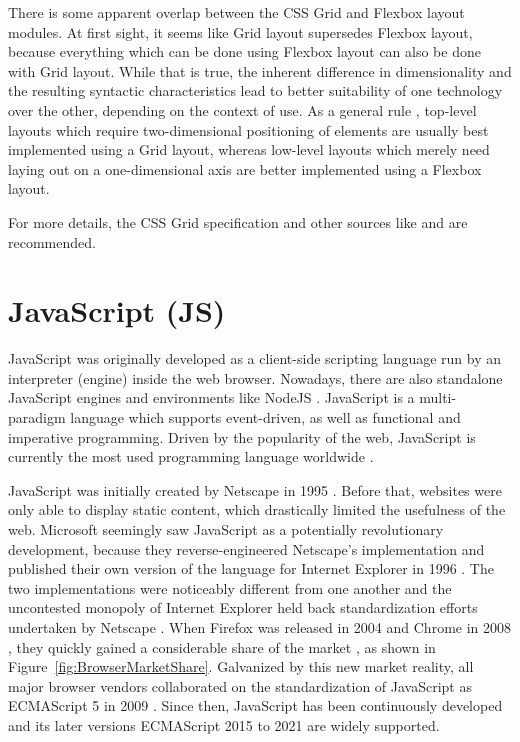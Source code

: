 There is some apparent overlap between the CSS Grid and Flexbox layout
modules. At first sight, it seems like Grid layout supersedes Flexbox
layout, because everything which can be done using Flexbox layout can
also be done with Grid layout. While that is true, the inherent
difference in dimensionality and the resulting syntactic
characteristics lead to better suitability of one technology over the
other, depending on the context of use. As a general rule
\parencite{CSSGridVsFlexbox}, top-level layouts which require
two-dimensional positioning of elements are usually best implemented
using a Grid layout, whereas low-level layouts which merely need
laying out on a one-dimensional axis are better implemented using a
Flexbox layout.

For more details, the CSS Grid specification \parencite{CSSGrid} and
other sources like \textcite{GridLayoutInCSS} and
\textcite{House-GridGuide} are recommended.





\section{JavaScript (JS)}
\label{sec:JS}

JavaScript was originally developed as a client-side scripting
language run by an interpreter (engine) inside the web browser.
Nowadays, there are also standalone JavaScript engines and
environments like NodeJS \parencite{NodeJS}. JavaScript is a
multi-paradigm language which supports event-driven, as well as
functional and imperative programming. Driven by the popularity of the
web, JavaScript is currently the most used programming language
worldwide \parencite{StatisticProgrammingLanguageUsage}.

JavaScript was initially created by Netscape in 1995
\parencite{JSFirstRelease}. Before that, websites were only able to
display static content, which drastically limited the usefulness of
the web. Microsoft seemingly saw JavaScript as a potentially
revolutionary development, because they reverse-engineered Netscape's
implementation and published their own version of the language for
Internet Explorer in 1996 \parencite{JSIERelease}. The two
implementations were noticeably different from one another and the
uncontested monopoly of Internet Explorer
\parencite{BrowserMarketShareEarly} held back standardization efforts
undertaken by Netscape \parencite{ECMAScript1}. When Firefox was
released in 2004 \parencite{FirefoxFirstRelease} and Chrome in 2008
\parencite{ChromeFirstRelease}, they quickly gained a considerable
share of the market \parencite{BrowserMarketShare}, as shown in
Figure~\ref{fig:BrowserMarketShare}. Galvanized by this new market
reality, all major browser vendors collaborated on the standardization
of JavaScript as ECMAScript 5 in 2009 \parencite{ECMAScript5}. Since
then, JavaScript has been continuously developed and its later
versions ECMAScript 2015 to 2021 \parencite{ECMAScript6, ECMAScript7,
  ECMAScript8, ECMAScript9, ECMAScript10, ECMAScript11, ECMAScript12}
are widely supported.


